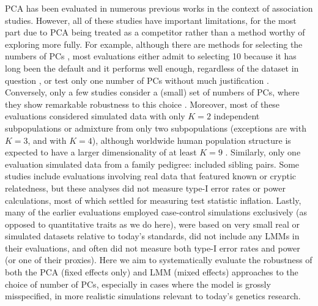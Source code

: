 \documentclass[11pt]{article}
\begin{document}
PCA has been evaluated in numerous previous works in the context of association studies.
However, all of these studies have important limitations, for the most part due to PCA being treated as a competitor rather than a method worthy of exploring more fully.
For example, although there are methods for selecting the numbers of PCs \citep{patterson_population_2006}, most evaluations either admit to selecting 10 because it has long been the default and it performs well enough, regardless of the dataset in question \citep{epstein_simple_2007, li_improved_2008, astle_population_2009, li_correcting_2010, wu_comparison_2011}, or test only one number of PCs without much justification \citep{zhang_semiparametric_2003, kimmel_randomization_2007, zhao_arabidopsis_2007, zhang_comparison_2008, price_new_2010, bouaziz_accounting_2011, hoffman_correcting_2013, wang_analytical_2013, tucker_improving_2014, yang_advantages_2014, sul_population_2018}.
Conversely, only a few studies consider a (small) set of numbers of PCs, where they show remarkable robustness to this choice \citep{price_principal_2006, kang_variance_2010, wojcik_genetic_2019}.
Moreover, most of these evaluations considered simulated data with only $K = 2$ independent subpopulations or admixture from only two subpopulations (exceptions are \citet{astle_population_2009} with $K=3$, and \citet{wang_analytical_2013} with $K = 4$), although worldwide human population structure is expected to have a larger dimensionality of at least $K = 9$ \citep{wojcik_genetic_2019}.
Similarly, only one evaluation simulated data from a family pedigree: \citet{price_new_2010} included sibling pairs.
Some studies include evaluations involving real data that featured known or cryptic relatedness, but these analyses did not measure type-I error rates or power calculations, most of which settled for measuring test statistic inflation.
Lastly, many of the earlier evaluations employed case-control simulations exclusively (as opposed to quantitative traits as we do here), were based on very small real or simulated datasets relative to today's standards, did not include any LMMs in their evaluations, and often did not measure both type-I error rates and power (or one of their proxies).
Here we aim to systematically evaluate the robustness of both the PCA (fixed effects only) and LMM (mixed effects) approaches to the choice of number of PCs, especially in cases where the model is grossly misspecified, in more realistic simulations relevant to today's genetics research.
\end{document}
